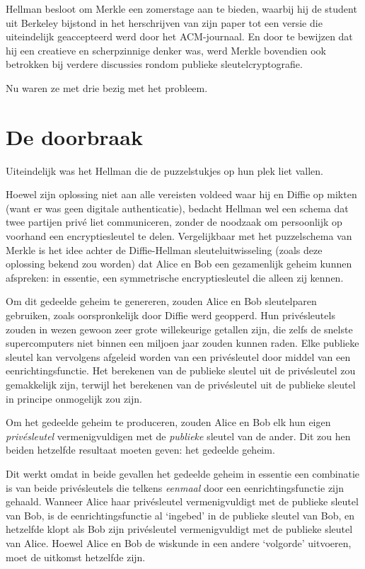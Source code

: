 \documentclass[smalldemyvopaper,11pt,twoside,onecolumn,openright,extrafontsizes,hidelinks]{memoir}
\begin{document}
Hellman besloot om Merkle een zomerstage aan te bieden, waarbij hij de
student uit Berkeley bijstond in het herschrijven van zijn paper tot een
versie die uiteindelijk geaccepteerd werd door het ACM-journaal. En door
te bewijzen dat hij een creatieve en scherpzinnige denker was, werd
Merkle bovendien ook betrokken bij verdere discussies rondom publieke
sleutelcryptografie.

Nu waren ze met drie bezig met het probleem.

\section{De doorbraak}\label{de-doorbraak}

Uiteindelijk was het Hellman die de puzzelstukjes op hun plek liet
vallen.

Hoewel zijn oplossing niet aan alle vereisten voldeed waar hij en Diffie
op mikten (want er was geen digitale authenticatie), bedacht Hellman wel
een schema dat twee partijen privé liet communiceren, zonder de noodzaak
om persoonlijk op voorhand een encryptiesleutel te delen. Vergelijkbaar
met het puzzelschema van Merkle is het idee achter de Diffie-Hellman
sleuteluitwisseling (zoals deze oplossing bekend zou worden) dat Alice
en Bob een gezamenlijk geheim kunnen afspreken: in essentie, een
symmetrische encryptiesleutel die alleen zij kennen.

Om dit gedeelde geheim te genereren, zouden Alice en Bob sleutelparen
gebruiken, zoals oorspronkelijk door Diffie werd geopperd. Hun
privésleutels zouden in wezen gewoon zeer grote willekeurige getallen
zijn, die zelfs de snelste supercomputers niet binnen een miljoen jaar
zouden kunnen raden. Elke publieke sleutel kan vervolgens afgeleid
worden van een privésleutel door middel van een eenrichtingsfunctie. Het
berekenen van de publieke sleutel uit de privésleutel zou gemakkelijk
zijn, terwijl het berekenen van de privésleutel uit de publieke sleutel
in principe onmogelijk zou zijn.

Om het gedeelde geheim te produceren, zouden Alice en Bob elk hun eigen
\emph{privésleutel} vermenigvuldigen met de \emph{publieke} sleutel van
de ander. Dit zou hen beiden hetzelfde resultaat moeten geven: het
gedeelde geheim.

Dit werkt omdat in beide gevallen het gedeelde geheim in essentie een
combinatie is van beide privésleutels die telkens \emph{eenmaal} door
een eenrichtingsfunctie zijn gehaald. Wanneer Alice haar privésleutel
vermenigvuldigt met de publieke sleutel van Bob, is de
eenrichtingsfunctie al `ingebed' in de publieke sleutel van Bob, en
hetzelfde klopt als Bob zijn privésleutel vermenigvuldigt met de
publieke sleutel van Alice. Hoewel Alice en Bob de wiskunde in een
andere `volgorde' uitvoeren, moet de uitkomst hetzelfde zijn.
\end{document}
